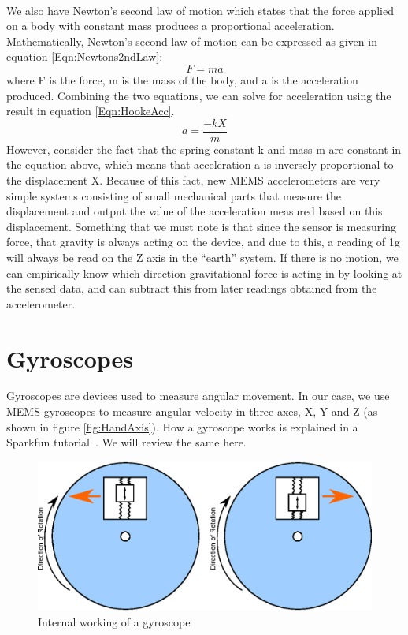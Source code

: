 \hfill \\
We also have Newton's second law of motion
which states that the force applied on a body with constant mass produces a proportional acceleration.
Mathematically, Newton's second law of motion can be expressed as given in equation \ref{Eqn:Newtons2ndLaw}:
\begin{equation}
\label{Eqn:Newtons2ndLaw}
F = ma 
\end{equation}
where F is the force, m is the mass of the body, and a is the acceleration produced. Combining the two equations, we can solve for acceleration using the result in equation \ref{Eqn:HookeAcc}.
\begin{equation}
\label{Eqn:HookeAcc}
a = \frac{-kX}{m} 
\end{equation}
However, consider the fact that the spring constant k and mass m are constant in the equation above, which means that acceleration a is inversely proportional to the displacement X. Because of this fact, new MEMS accelerometers are very simple systems consisting of small mechanical parts that measure the displacement and output the value of the acceleration measured based on this displacement.
Something that we must note is that since the sensor is measuring force, that gravity is always acting on the device,
and due to this, a reading of 1g will always be read on the Z axis in the ``earth'' system.
If there is no motion, we can empirically know which direction gravitational force is acting in by looking at the sensed data,
and can subtract this from later readings obtained from the accelerometer.

\section{Gyroscopes}
\label{Sec:Gyroscope}

Gyroscopes are devices used to measure angular movement. In our case, we use MEMS gyroscopes to measure angular velocity in three axes, X, Y and Z (as shown in figure \ref{fig:HandAxis}). How a gyroscope works is explained in a Sparkfun tutorial~\cite{Web:SparkfunGyros}. We will review the same here.
\begin{figure}
\begin{center}
\includegraphics{images/GyroWork.eps}
\caption{Internal working of a gyroscope}
\label{fig:GyroDiag}
\end{center}
\end{figure}

